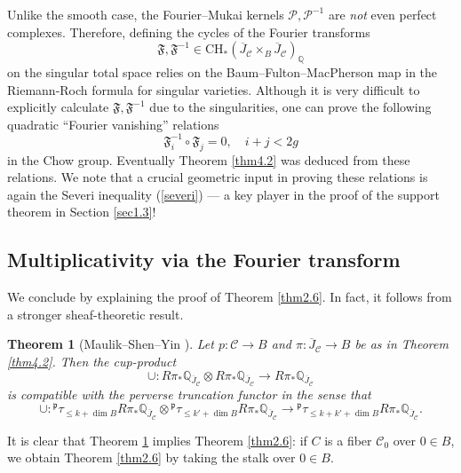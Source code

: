 \documentclass{pspum-l}
\theoremstyle{plain}
\newtheorem{thm}{Theorem}[section]
\theoremstyle{definition}
\theoremstyle{remark}
\newcommand{\BQ}{{\mathbb{Q}}}
\newcommand{\CC}{{\mathcal C}}
\newcommand{\CP}{{\mathcal P}}
\begin{document}
Unlike the smooth case, the Fourier--Mukai kernels $\CP, \CP^{-1}$ are \emph{not} even perfect complexes. Therefore, defining the cycles of the Fourier transforms
\[
\mathfrak{F}, \mathfrak{F}^{-1} \in \mathrm{CH}_*\left(\overline{J}_\CC \times_B \overline{J}_\CC \right)_\BQ
\]
on the singular total space relies on  the Baum--Fulton--MacPherson map in the Riemann-Roch formula for singular varieties. Although it is very difficult to explicitly calculate $\mathfrak{F}, \mathfrak{F}^{-1}$ due to the singularities, one can prove the following quadratic ``Fourier vanishing'' relations 
\[
\mathfrak{F}^{-1}_i \circ \mathfrak{F}_j= 0, \quad i+j < 2g
\]
in the Chow group. Eventually Theorem \ref{thm4.2} was deduced from these relations. We note that a crucial geometric input in proving these relations is again the Severi inequality (\ref{severi}) --- a key player in the proof of the support theorem in Section \ref{sec1.3}!




\subsection{Multiplicativity via the Fourier transform}\label{sec4.3}


We conclude by explaining the proof of Theorem \ref{thm2.6}. In fact, it follows from a stronger sheaf-theoretic result.

\begin{thm}[Maulik--Shen--Yin \cite{MSY}]\label{thm4.3}
Let $p:\CC \to B$ and $\pi: \overline{J}_\CC \to B$ be as in Theorem \ref{thm4.2}. Then the cup-product
\[
\cup: R\pi_* \BQ_{\overline{J}_\CC} \otimes R\pi_* \BQ_{\overline{J}_\CC}  \to R\pi_* \BQ_{\overline{J}_\CC} 
\]
is compatible with 
the perverse truncation functor in the sense that
\[
\cup: {^\mathfrak{p}}\tau_{\leq k+\dim B} R\pi_* \BQ_{\overline{J}_\CC} \otimes{^\mathfrak{p}}\tau_{\leq k'+\dim B} R\pi_* \BQ_{\overline{J}_\CC} \to {^\mathfrak{p}}\tau_{\leq k+k'+\dim B} R\pi_* \BQ_{\overline{J}_\CC}.
\]
\end{thm}

It is clear that Theorem \ref{thm4.3} implies Theorem \ref{thm2.6}: if $C$ is a fiber $\CC_0$ over $0\in B$, we obtain Theorem \ref{thm2.6} by taking the stalk over $0\in B$.
\end{document}
